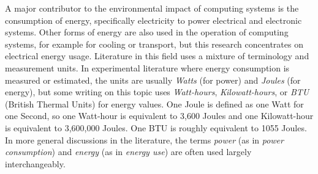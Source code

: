 A major contributor to the environmental impact of computing systems is the consumption of energy, specifically electricity to power electrical and electronic systems. Other forms of energy are also used in the operation of computing systems, for example for cooling or transport, but this research concentrates on electrical energy usage. Literature in this field uses a mixture of terminology and measurement units. In experimental literature where energy consumption is measured or estimated, the units are usually \emph{Watts} (for power) and \emph{Joules} (for energy), but some writing on this topic uses \emph{Watt-hours}, \emph{Kilowatt-hours}, or \emph{BTU} (British Thermal Units) for energy values. One Joule is defined as one Watt for one Second, so one Watt-hour is equivalent to 3,600 Joules and one Kilowatt-hour is equivalent to 3,600,000 Joules. One BTU is roughly equivalent to 1055 Joules. In more general discussions in the literature, the terms \emph{power} (as in \emph{power consumption}) and \emph{energy} (as in \emph{energy use}) are often used largely interchangeably.

